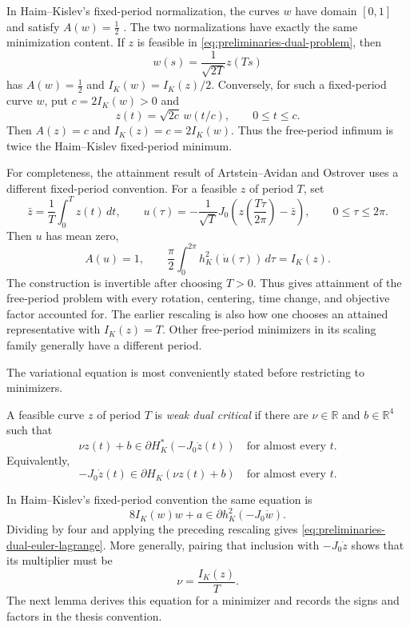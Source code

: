 In Haim--Kislev's fixed-period normalization, the curves \(w\) have domain
\([0,1]\) and satisfy \(A(w)=\frac12\) \cite[Lemma~2.1]{HK2017}.  The two
normalizations have exactly the same minimization content.  If \(z\) is feasible in
\eqref{eq:preliminaries-dual-problem}, then
\[
  w(s)=\frac{1}{\sqrt{2T}}z(Ts)
\]
has \(A(w)=\frac12\) and \(I_K(w)=I_K(z)/2\).  Conversely, for such a
fixed-period curve \(w\), put \(c=2I_K(w)>0\) and
\[
  z(t)=\sqrt{2c}\,w(t/c),
  \qquad 0\leq t\leq c.
\]
Then \(A(z)=c\) and \(I_K(z)=c=2I_K(w)\).  Thus the free-period infimum is
twice the Haim--Kislev fixed-period minimum.

For completeness, the attainment result of Artstein--Avidan and Ostrover uses
a different fixed-period convention.  For a feasible \(z\) of period \(T\),
set
\[
  \bar z=\frac1T\int_0^Tz(t)\,dt,
  \qquad
  u(\tau)=-\frac1{\sqrt T}J_0
    \left(z\!\left(\frac{T\tau}{2\pi}\right)-\bar z\right),
  \qquad 0\leq\tau\leq2\pi.
\]
Then \(u\) has mean zero,
\[
  A(u)=1,
  \qquad
  \frac\pi2\int_0^{2\pi}h_K^2(\dot u(\tau))\,d\tau=I_K(z).
\]
The construction is invertible after choosing \(T>0\).  Thus
\cite[Proposition~2.5]{AAO2014} gives attainment of the free-period problem
with every rotation, centering, time change, and objective factor accounted
for.  The earlier rescaling is also how one chooses an attained representative
with \(I_K(z)=T\).  Other free-period minimizers in its scaling family
generally have a different period.

The variational equation is most conveniently stated before restricting to
minimizers.

\begin{definition}
\label{def:preliminaries-weak-dual-critical}
A feasible curve \(z\) of period \(T\) is \emph{weak dual critical} if there
are \(\nu\in\mathbb R\) and \(b\in\mathbb R^4\) such that
\begin{equation}\label{eq:preliminaries-dual-euler-lagrange}
  \nu z(t)+b
  \in\partial H_K^*(-J_0\dot z(t))
  \quad\text{for almost every }t.
\end{equation}
Equivalently,
\[
  -J_0\dot z(t)\in\partial H_K(\nu z(t)+b)
  \quad\text{for almost every }t.
\]
\end{definition}

In Haim--Kislev's fixed-period convention the same equation is
\[
  8I_K(w)w+a\in\partial h_K^2(-J_0\dot w).
\]
Dividing by four and applying the preceding rescaling gives
\eqref{eq:preliminaries-dual-euler-lagrange}.  More generally, pairing that
inclusion with \(-J_0\dot z\) shows that its multiplier must be
\begin{equation}\label{eq:preliminaries-dual-multiplier-value}
  \nu=\frac{I_K(z)}{T}.
\end{equation}
The next lemma derives this equation for a minimizer and records the signs and
factors in the thesis convention.

